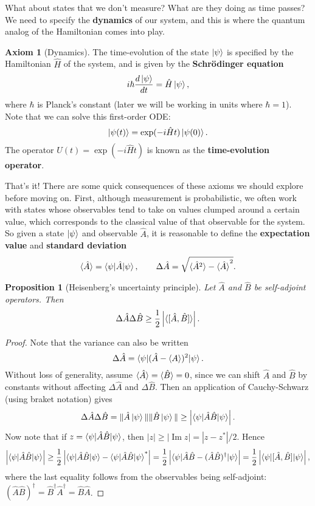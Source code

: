 \documentclass{report}
\theoremstyle{plain}
\newtheorem{proposition}[theorem]{Proposition}
\theoremstyle{definition}
\newtheorem{axiom}{Axiom}
\theoremstyle{remark}
\DeclareMathOperator{\im}{Im}
\begin{document}
What about states that we don't measure? What are they doing as time
passes? We need to specify the {\bf dynamics} of our system, and this
is where the quantum analog of the Hamiltonian comes into play.

\begin{axiom}[Dynamics]
  The time-evolution of the state $\ket{\psi}$ is specified by the
  Hamiltonian $\hat{H}$ of the system, and is given by the {\bf
    Schr\"odinger equation}
  $$ i\hbar \frac{d\ket{\psi}}{dt} = \hat{H}\ket{\psi}, $$
  where $\hbar$ is Planck's constant (later we will be working in
  units where $\hbar = 1$). Note that we can solve this first-order ODE:
  $$ \ket{\psi(t)} = \exp(-i\hat{H}t)\ket{\psi(0)}. $$
  The operator $U(t) = \exp(-i\hat{H}t)$ is known as the {\bf
    time-evolution operator}.
\end{axiom}

That's it! There are some quick consequences of these axioms we should
explore before moving on. First, although measurement is
probabilistic, we often work with states whose observables tend to
take on values clumped around a certain value, which corresponds to
the classical value of that observable for the system. So given a
state $\ket{\psi}$ and observable $\hat{A}$, it is reasonable to
define the {\bf expectation value} and {\bf standard deviation}
$$ \braket{\hat{A}} = \braket{\psi|\hat{A}|\psi}, \qquad \Delta \hat{A} = \sqrt{\braket{\hat{A}^2} - \braket{\hat{A}}^2}. $$

\begin{proposition}[Heisenberg's uncertainty principle]
  Let $\hat{A}$ and $\hat{B}$ be self-adjoint operators. Then
  $$ \Delta \hat{A} \Delta \hat{B} \ge \frac{1}{2}\left|\braket{[\hat{A}, \hat{B}]}\right|. $$
\end{proposition}

\begin{proof}
  Note that the variance can also be written 
  $$ \Delta \hat{A} = \braket{\psi|(\hat{A} - \braket{A})^2|\psi}. $$
  Without loss of generality, assume
  $\braket{\hat{A}} = \braket{\hat{B}} = 0$, since we can shift
  $\hat{A}$ and $\hat{B}$ by constants without affecting
  $\Delta \hat{A}$ and $\Delta \hat{B}$. Then an application of
  Cauchy-Schwarz (using braket notation) gives
  $$ \Delta \hat{A} \Delta \hat{B} = \|\hat{A}\ket{\psi}\| \|\hat{B}\ket{\psi}\| \ge \left|\braket{\psi|\hat{A}\hat{B}|\psi}\right|. $$
  Now note that if $z = \braket{\psi|\hat{A}\hat{B}|\psi}$, then
  $|z| \ge |\im z| = |z - z^*|/2$. Hence
  $$ \left|\braket{\psi|\hat{A}\hat{B}|\psi}\right| \ge \frac{1}{2}\left|\braket{\psi|\hat{A}\hat{B}|\psi} - \braket{\psi|\hat{A}\hat{B}|\psi}^*\right| = \frac{1}{2}\left|\braket{\psi|\hat{A}\hat{B} - (\hat{A}\hat{B})^\dagger|\psi}\right| = \frac{1}{2}\left|\braket{\psi|[\hat{A}, \hat{B}]|\psi}\right|, $$
  where the last equality follows from the observables being
  self-adjoint:
  $(\hat{A}\hat{B})^\dagger = \hat{B}^\dagger\hat{A}^\dagger =
  \hat{B}\hat{A}$.
\end{proof}
\end{document}
